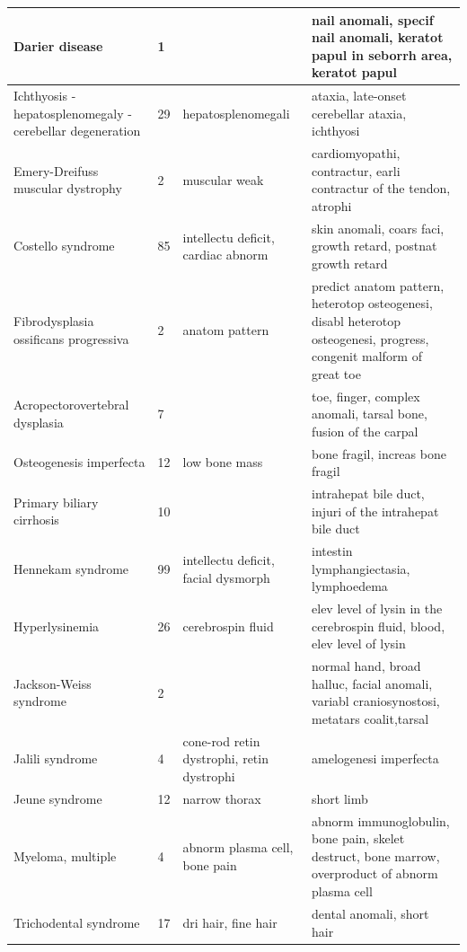 \documentclass[10pt,letterpaper,final]{article}
\begin{document}
\begin{center}
\begin{small}
\begin{longtable}{|p{3.5cm}|p{1.5cm}|p{3cm}|p{3cm}|}
Darier disease & 1 &  &  nail anomali, specif nail anomali, keratot papul in seborrh area, keratot papul \\ \hline
Ichthyosis - hepatosplenomegaly - cerebellar degeneration & 29 & hepatosplenomegali & ataxia, late-onset cerebellar ataxia, ichthyosi \\ \hline
Emery-Dreifuss muscular dystrophy & 2 & muscular weak &  cardiomyopathi, contractur, earli contractur of the tendon, atrophi \\ \hline
Costello syndrome & 85 & intellectu deficit, cardiac abnorm &  skin anomali, coars faci, growth retard, postnat growth retard \\ \hline
Fibrodysplasia ossificans progressiva & 2 & anatom pattern  & predict anatom pattern, heterotop osteogenesi, disabl heterotop osteogenesi, progress, congenit malform of great toe  \\ \hline
Acropectorovertebral dysplasia & 7 &  & toe, finger, complex anomali, tarsal bone, fusion of the carpal \\ \hline
Osteogenesis imperfecta & 12 & low bone mass & bone fragil, increas bone fragil \\ \hline
Primary biliary cirrhosis & 10  &  & intrahepat bile duct, injuri of the intrahepat bile duct \\ \hline
Hennekam syndrome & 99 & intellectu deficit, facial dysmorph & intestin lymphangiectasia, lymphoedema \\ \hline
Hyperlysinemia & 26  & cerebrospin fluid & elev level of lysin in the cerebrospin fluid, blood, elev level of lysin \\ \hline
Jackson-Weiss syndrome & 2 &  & normal hand, broad halluc, facial anomali, variabl craniosynostosi, metatars coalit,tarsal \\ \hline
Jalili syndrome & 4 & cone-rod retin dystrophi, retin dystrophi  & amelogenesi imperfecta \\ \hline
Jeune syndrome & 12 & narrow thorax &  short limb \\ \hline
Myeloma, multiple & 4 & abnorm plasma cell, bone pain & abnorm immunoglobulin, bone pain, skelet destruct, bone marrow, overproduct of abnorm plasma cell \\ \hline
Trichodental syndrome & 17 & dri hair, fine hair & dental anomali, short hair  \\ \hline
	\end{longtable}
\end{small}
\end{center}
\end{document}
